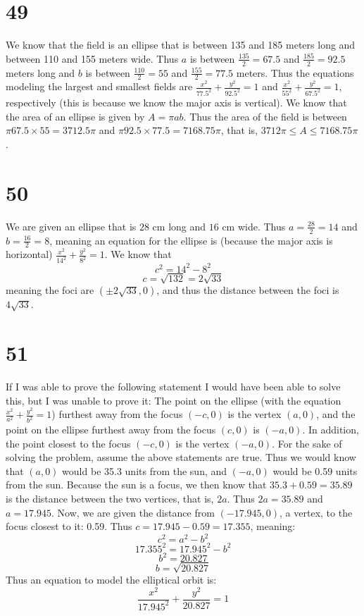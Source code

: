 \documentclass{article}
\theoremstyle{definition}
\newcommand{\?}{\stackrel{?}{=}}
\begin{document}
\section*{49}
We know that the field is an ellipse that is between 135 and 185 meters long and between 110 and 155 meters wide. Thus $a$ is between $\frac{135}{2}=67.5$ and 
$\frac{185}{2}=92.5$ meters long and $b$ is between $\frac{110}{2}=55$ and $\frac{155}{2}=77.5$ meters. Thus the equations modeling the largest and smallest fields are 
$\frac{x^2}{77.5^2}+\frac{y^2}{92.5^2}=1$ and $\frac{x^2}{55^2}+\frac{y^2}{67.5^2}=1$, respectively (this is because we know the major axis is vertical). 
We know that the area of an ellipse is given by 
$A=\pi ab$. Thus the area of the field is between $\pi 67.5\times 55=3712.5\pi$ and $\pi 92.5\times 77.5=7168.75\pi$, that is, 
$3712\pi \le A\le 7168.75\pi $.

\section*{50}
We are given an ellipse that is $28$ cm long and $16$ cm wide. Thus $a=\frac{28}{2}=14$ and $b=\frac{16}{2}=8$, meaning an equation for the ellipse is (because the major 
axis is horizontal) 
$\frac{x^2}{14^2}+\frac{y^2}{8^2}=1$. We know that \[ c^2=14^2-8^2 \] \[ c=\sqrt{132}=2\sqrt{33} \] meaning the foci are $(\pm 2\sqrt{33},0)$, and thus the distance 
between the foci is $4\sqrt{33}$.

\section*{51}
If I was able to prove the following statement I would have been able to solve this, but I was unable to prove it: The point on the ellipse (with the equation 
$\frac{x^2}{a^2}+\frac{y^2}{b^2}=1$) furthest away from the 
focus $(-c,0)$ is the vertex $(a,0)$, and the point on the ellipse furthest away from the focus $(c,0)$ is $(-a,0)$. In addition, the point closest to the 
focus $(-c,0)$ is the vertex $(-a,0)$. For the sake of solving the problem, assume the above statements are true. Thus we would know that $(a,0)$ would be 
35.3 units from the sun, and $(-a,0)$ would be 0.59 units from the sun. Because the sun is a focus, we then know that $35.3+0.59=35.89$ is the distance between 
the two vertices, that is, $2a$. Thus $2a=35.89$ and $a=17.945$. Now, we are given the distance from $(-17.945,0)$, a vertex, to the focus closest to it: 
0.59. Thus $c=17.945-0.59=17.355$, meaning:
\[ c^2=a^2-b^2 \]
\[ 17.355^2=17.945^2-b^2 \]
\[ b^2=20.827 \] \[ b=\sqrt{20.827} \] Thus an equation to model the elliptical orbit is:
\[ \frac{x^2}{17.945^2}+\frac{y^2}{20.827}=1 \] 
\end{document}
